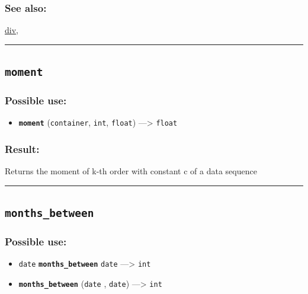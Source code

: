 \documentclass[]{book}
\providecommand{\tightlist}{%
  \setlength{\itemsep}{0pt}\setlength{\parskip}{0pt}}
\theoremstyle{definition}
\theoremstyle{definition}
\theoremstyle{definition}
\theoremstyle{remark}
\begin{document}
\subsubsection{See also:}\label{see-also-143}

\href{operators-d-to-h.html\#div}{div},

\begin{center}\rule{0.5\linewidth}{\linethickness}\end{center}

\subsection{\texorpdfstring{\texttt{moment}}{moment}}\label{moment}

\subsubsection{Possible use:}\label{possible-use-361}

\begin{itemize}
\tightlist
\item
  \textbf{\texttt{moment}} (\texttt{container}, \texttt{int},
  \texttt{float}) ---\textgreater{} \texttt{float}
\end{itemize}

\subsubsection{Result:}\label{result-350}

Returns the moment of k-th order with constant c of a data sequence

\begin{center}\rule{0.5\linewidth}{\linethickness}\end{center}

\subsection{\texorpdfstring{\texttt{months\_between}}{months\_between}}\label{months_between}

\subsubsection{Possible use:}\label{possible-use-362}

\begin{itemize}
\tightlist
\item
  \texttt{date} \textbf{\texttt{months\_between}} \texttt{date}
  ---\textgreater{} \texttt{int}
\item
  \textbf{\texttt{months\_between}} (\texttt{date} , \texttt{date})
  ---\textgreater{} \texttt{int}
\end{itemize}
\end{document}
